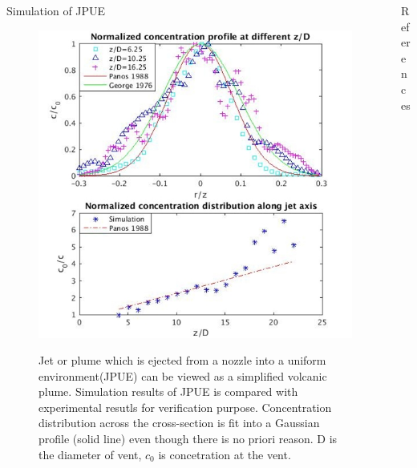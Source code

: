 \documentclass[final]{beamer}
\newlength{\onecolwid}
\newlength{\twocolwid}
\begin{document}
\begin{frame}[t]
\begin{columns}[t]
\begin{column}{\twocolwid}
\begin{columns}[t,totalwidth=\twocolwid]
\begin{column}{\onecolwid}
\begin{block}{Simulation of JPUE}
\begin{figure}
\centering
{\includegraphics[height= 0.690\linewidth]{jpue_conc}}
\caption{Jet or plume which is ejected from a nozzle into a uniform environment(JPUE) can be viewed as a simplified volcanic plume. Simulation results of JPUE is compared with experimental resutls \cite{papanicolaou1988investigations, george1977turbulence} for verification purpose. Concentration distribution across the cross-section is fit into a Gaussian profile (solid line) even though there is no priori reason. D is the diameter of vent, $c_0$ is concetration at the vent.}
\end{figure}

\end{block}

\end{column} %

\begin{column}{\onecolwid}\vspace{-1.4in} 
\begin{alertblock}{References}

\small{
}

\end{alertblock}



\end{column}
\end{columns}
\end{column}
\end{columns}
\end{frame}
\end{document}

